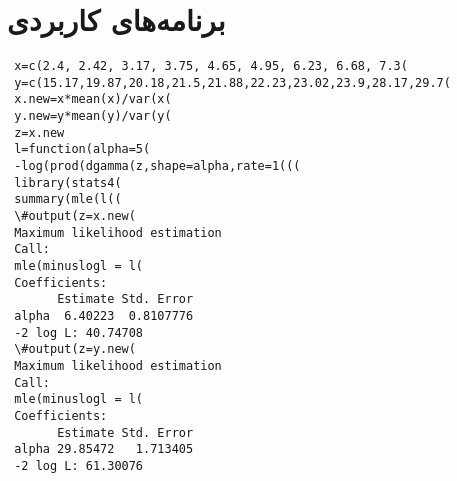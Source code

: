 \chapter{برنامه‌های کاربردی}
\begin{LTR}
\begin{verbatim}
 x=c(2.4, 2.42, 3.17, 3.75, 4.65, 4.95, 6.23, 6.68, 7.3(
 y=c(15.17,19.87,20.18,21.5,21.88,22.23,23.02,23.9,28.17,29.7(
 x.new=x*mean(x)/var(x(
 y.new=y*mean(y)/var(y(
 z=x.new
 l=function(alpha=5(
 -log(prod(dgamma(z,shape=alpha,rate=1(((
 library(stats4(
 summary(mle(l((
 \#output(z=x.new(
 Maximum likelihood estimation
 Call:
 mle(minuslogl = l(
 Coefficients:
       Estimate Std. Error
 alpha  6.40223  0.8107776
 -2 log L: 40.74708 
 \#output(z=y.new(
 Maximum likelihood estimation
 Call:
 mle(minuslogl = l(
 Coefficients:
       Estimate Std. Error
 alpha 29.85472   1.713405
 -2 log L: 61.30076 
\end{verbatim}
\end{LTR}